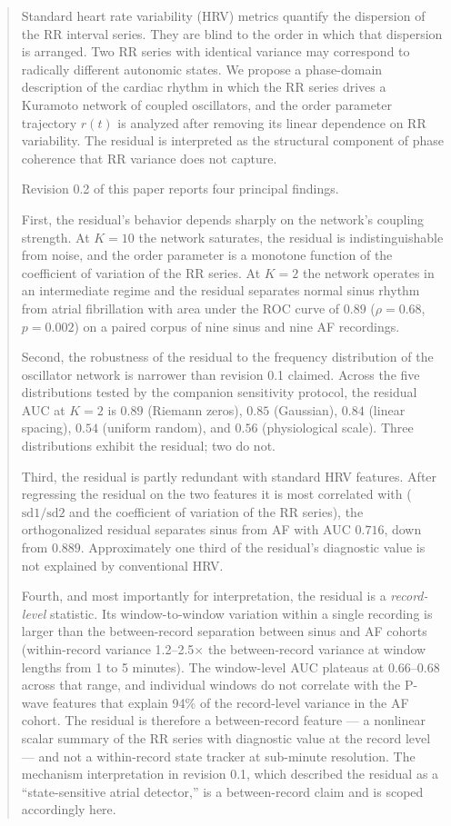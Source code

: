 \documentclass[11pt]{article}
\begin{document}
\begin{abstract}
Standard heart rate variability (HRV) metrics quantify the dispersion of
the RR interval series. They are blind to the order in which that
dispersion is arranged. Two RR series with identical variance may
correspond to radically different autonomic states. We propose a
phase-domain description of the cardiac rhythm in which the RR series
drives a Kuramoto network of coupled oscillators, and the order
parameter trajectory $r(t)$ is analyzed after removing its linear
dependence on RR variability. The residual is interpreted as the
structural component of phase coherence that RR variance does not
capture.

Revision 0.2 of this paper reports four principal findings.

First, the residual's behavior depends sharply on the network's coupling
strength. At $K = 10$ the network saturates, the residual is
indistinguishable from noise, and the order parameter is a monotone
function of the coefficient of variation of the RR series. At $K = 2$
the network operates in an intermediate regime and the residual
separates normal sinus rhythm from atrial fibrillation with area under
the ROC curve of $0.89$ ($\rho = 0.68$, $p = 0.002$) on a paired
corpus of nine sinus and nine AF recordings.

Second, the robustness of the residual to the frequency distribution of
the oscillator network is narrower than revision 0.1 claimed. Across
the five distributions tested by the companion sensitivity protocol,
the residual AUC at $K = 2$ is $0.89$ (Riemann zeros), $0.85$
(Gaussian), $0.84$ (linear spacing), $0.54$ (uniform random), and
$0.56$ (physiological scale). Three distributions exhibit the residual;
two do not.

Third, the residual is partly redundant with standard HRV features.
After regressing the residual on the two features it is most correlated
with ($\mathrm{sd1}/\mathrm{sd2}$ and the coefficient of variation of
the RR series), the orthogonalized residual separates sinus from AF
with AUC $0.716$, down from $0.889$. Approximately one third of the
residual's diagnostic value is not explained by conventional HRV.

Fourth, and most importantly for interpretation, the residual is a
\emph{record-level} statistic. Its window-to-window variation within a
single recording is larger than the between-record separation between
sinus and AF cohorts (within-record variance 1.2--2.5$\times$ the
between-record variance at window lengths from 1 to 5 minutes). The
window-level AUC plateaus at $0.66$--$0.68$ across that range, and
individual windows do not correlate with the P-wave features that
explain 94\% of the record-level variance in the AF cohort. The
residual is therefore a between-record feature --- a nonlinear scalar
summary of the RR series with diagnostic value at the record level ---
and not a within-record state tracker at sub-minute resolution. The
mechanism interpretation in revision 0.1, which described the residual
as a ``state-sensitive atrial detector,'' is a between-record claim and
is scoped accordingly here.
\end{abstract}
\end{document}
